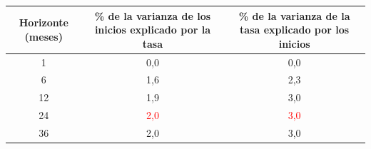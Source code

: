\begin{tabular}{ccc}
\toprule
Horizonte (meses) & \% de la varianza de los inicios explicado por la tasa & \% de la varianza de la tasa explicado por los inicios
\\ \midrule
1 & 0{,}0 & 0{,}0 \\
6 & 1{,}6 & 2{,}3 \\
12 & 1{,}9 & 3{,}0 \\
24 & \textcolor{red}{2{,}0} & \textcolor{red}{3{,}0} \\
36 & 2{,}0 & 3{,}0 \\
\bottomrule
\end{tabular}
